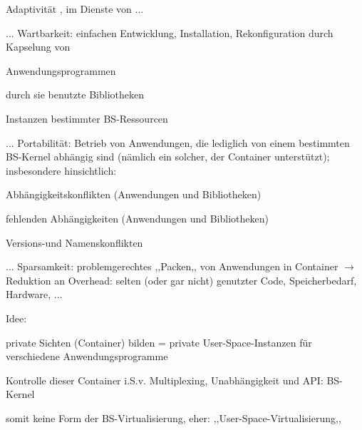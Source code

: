 \documentclass[a4paper]{article}
\begin{document}
\begin{multicols}{3}
    \begin{itemize*}
        \item Adaptivität , im Dienste von ...
        \item ... Wartbarkeit: einfachen Entwicklung, Installation, Rekonfiguration
        durch Kapselung von
        \begin{itemize*}
            \item Anwendungsprogrammen
            \item \begin{itemize*} \item durch sie benutzte Bibliotheken \end{itemize*}
            \item \begin{itemize*} \item Instanzen bestimmter BS-Ressourcen \end{itemize*}
        \end{itemize*}
        \item ... Portabilität: Betrieb von Anwendungen, die lediglich von einem
        bestimmten BS-Kernel abhängig sind (nämlich ein solcher, der Container
        unterstützt); insbesondere hinsichtlich:
        \begin{itemize*}
            \item Abhängigkeitskonflikten (Anwendungen und Bibliotheken)
            \item fehlenden Abhängigkeiten (Anwendungen und Bibliotheken)
            \item Versions-und Namenskonflikten
        \end{itemize*}
        \item ... Sparsamkeit: problemgerechtes ,,Packen,, von Anwendungen in
        Container $\rightarrow$ Reduktion an Overhead: selten
        (oder gar nicht) genutzter Code, Speicherbedarf, Hardware, ...
    \end{itemize*}

    Idee:

    \begin{itemize*}
        \item private Sichten (Container) bilden = private User-Space-Instanzen für
        verschiedene Anwendungsprogramme
        \item Kontrolle dieser Container i.S.v. Multiplexing, Unabhängigkeit und
        API: BS-Kernel
        \item somit keine Form der BS-Virtualisierung, eher:
        ,,User-Space-Virtualisierung,,
    \end{itemize*}


\end{multicols}
\end{document}
